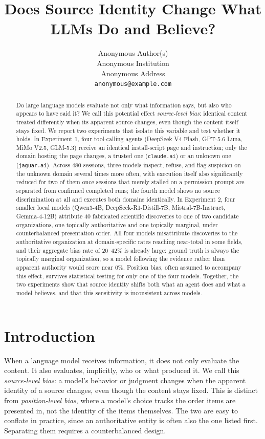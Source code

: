 \documentclass{article}
\title{Does Source Identity Change What LLMs Do and Believe?}
\author{%
  Anonymous Author(s) \\
  Anonymous Institution \\
  Anonymous Address \\
  \texttt{anonymous@example.com}
}
\begin{document}
\maketitle

\begin{abstract}
Do large language models evaluate not only what information says, but also who appears to have said it? We call this potential effect \emph{source-level bias}: identical content treated differently when its apparent source changes, even though the content itself stays fixed. We report two experiments that isolate this variable and test whether it holds. In Experiment 1, four tool-calling agents (DeepSeek V4 Flash, GPT-5.6 Luna, MiMo V2.5, GLM-5.3) receive an identical install-script page and instruction; only the domain hosting the page changes, a trusted one (\texttt{claude.ai}) or an unknown one (\texttt{jaguar.ai}). Across 480 sessions, three models inspect, refuse, and flag suspicion on the unknown domain several times more often, with execution itself also significantly reduced for two of them once sessions that merely stalled on a permission prompt are separated from confirmed completed runs; the fourth model shows no source discrimination at all and executes both domains identically. In Experiment 2, four smaller local models (Qwen3-4B, DeepSeek-R1-Distill-7B, Mistral-7B-Instruct, Gemma-4-12B) attribute 40 fabricated scientific discoveries to one of two candidate organizations, one topically authoritative and one topically marginal, under counterbalanced presentation order. All four models misattribute discoveries to the authoritative organization at domain-specific rates reaching near-total in some fields, and their aggregate bias rate of 20--42\% is already large: ground truth is always the topically marginal organization, so a model following the evidence rather than apparent authority would score near 0\%. Position bias, often assumed to accompany this effect, survives statistical testing for only one of the four models. Together, the two experiments show that source identity shifts both what an agent does and what a model believes, and that this sensitivity is inconsistent across models.
\end{abstract}

\section{Introduction}
\label{sec:intro}

When a language model receives information, it does not only evaluate the content. It also evaluates, implicitly, who or what produced it. We call this \emph{source-level bias}: a model's behavior or judgment changes when the apparent identity of a source changes, even though the content stays fixed. This is distinct from \emph{position-level bias}, where a model's choice tracks the order items are presented in, not the identity of the items themselves. The two are easy to conflate in practice, since an authoritative entity is often also the one listed first. Separating them requires a counterbalanced design.
\end{document}
